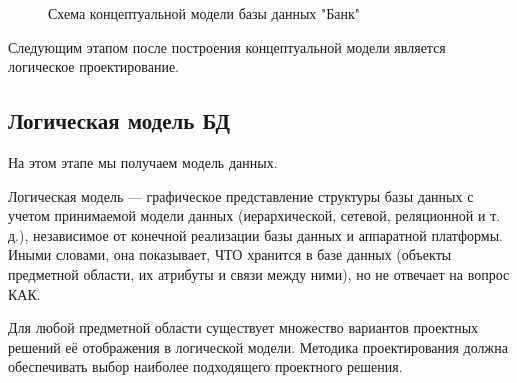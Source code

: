 \documentclass[14pt]{extarticle}
\begin{document}
\begin{figure}[!ht]
        \caption{Схема концептуальной модели базы данных "Банк"}
        \label{fig:concept-model}
    \end{figure}

    Следующим этапом после построения концептуальной модели является логическое проектирование.

    \newpage
    \subsection{Логическая модель БД}

    На этом этапе мы получаем модель данных.

    Логическая модель --- графическое представление структуры базы данных с учетом принимаемой модели данных (иерархической, сетевой, реляционной и т. д.), независимое от конечной реализации базы данных и аппаратной платформы. Иными словами, она показывает, ЧТО хранится в базе данных (объекты предметной области, их атрибуты и связи между ними), но не отвечает на вопрос КАК.

    Для любой предметной области существует множество вариантов проектных решений её отображения в логической модели. Методика проектирования должна обеспечивать выбор наиболее подходящего проектного решения.
\end{document}
